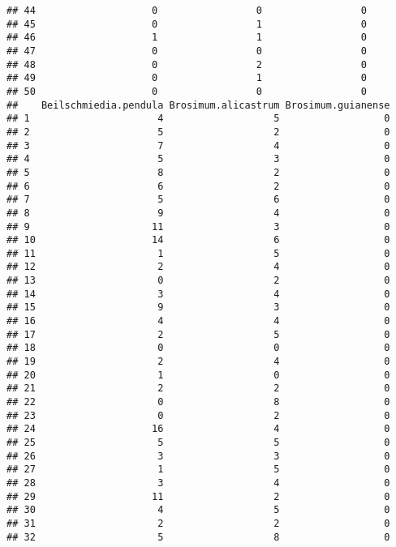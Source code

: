 \documentclass[
]{article}
\begin{document}
\begin{verbatim}
## 44                    0                 0                 0
## 45                    0                 1                 0
## 46                    1                 1                 0
## 47                    0                 0                 0
## 48                    0                 2                 0
## 49                    0                 1                 0
## 50                    0                 0                 0
##    Beilschmiedia.pendula Brosimum.alicastrum Brosimum.guianense
## 1                      4                   5                  0
## 2                      5                   2                  0
## 3                      7                   4                  0
## 4                      5                   3                  0
## 5                      8                   2                  0
## 6                      6                   2                  0
## 7                      5                   6                  0
## 8                      9                   4                  0
## 9                     11                   3                  0
## 10                    14                   6                  0
## 11                     1                   5                  0
## 12                     2                   4                  0
## 13                     0                   2                  0
## 14                     3                   4                  0
## 15                     9                   3                  0
## 16                     4                   4                  0
## 17                     2                   5                  0
## 18                     0                   0                  0
## 19                     2                   4                  0
## 20                     1                   0                  0
## 21                     2                   2                  0
## 22                     0                   8                  0
## 23                     0                   2                  0
## 24                    16                   4                  0
## 25                     5                   5                  0
## 26                     3                   3                  0
## 27                     1                   5                  0
## 28                     3                   4                  0
## 29                    11                   2                  0
## 30                     4                   5                  0
## 31                     2                   2                  0
## 32                     5                   8                  0

\end{verbatim}
\end{document}
